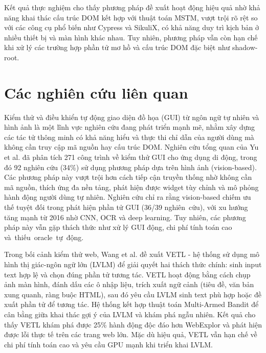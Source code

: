 \documentclass[a4paper, 12pt]{report}
\begin{document}
{\begin{tcolorbox}[
    colback=gray!10,
    colframe=gray!50!black,
    title=Trả lời cho RQ3,
    fonttitle=\bfseries,
    coltitle=white,
    colbacktitle=gray!50!black
]
Kết quả thực nghiệm cho thấy phương pháp đề xuất hoạt động hiệu quả nhờ khả năng khai thác cấu trúc DOM kết hợp với thuật toán MSTM, vượt trội rõ rệt so với các công cụ phổ biến như Cypress và SikuliX, có khả năng duy trì kịch bản ở nhiều thiết bị và màn hình khác nhau. Tuy nhiên, phương pháp vẫn còn hạn chế khi xử lý các trường hợp phần tử mơ hồ và cấu trúc DOM đặc biệt như shadow-root.
\end{tcolorbox}







\chapter{Các nghiên cứu liên quan}


Kiểm thử và điều khiển tự động giao diện đồ họa (GUI) từ ngôn ngữ tự nhiên và hình ảnh là một lĩnh vực nghiên cứu đang phát triển mạnh mẽ, nhằm xây dựng các tác tử thông minh có khả năng hiểu và thực thi chỉ dẫn của người dùng mà không cần truy cập mã nguồn hay cấu trúc DOM. Nghiên cứu tổng quan của Yu et al. \cite{yu2025visionbasedmobileappgui} đã phân tích 271 công trình về kiểm thử GUI cho ứng dụng di động, trong đó 92 nghiên cứu (34\%) sử dụng phương pháp dựa trên hình ảnh (vision-based). Các phương pháp này vượt trội hơn cách tiếp cận truyền thống nhờ không cần mã nguồn, thích ứng đa nền tảng, phát hiện được widget tùy chỉnh và mô phỏng hành động người dùng tự nhiên. Nghiên cứu chỉ ra rằng vision-based chiếm ưu thế tuyệt đối trong phát hiện phần tử GUI (36/39 nghiên~cứu), với xu hướng tăng mạnh từ 2016 nhờ CNN, OCR và deep learning. Tuy nhiên, các phương pháp này vẫn gặp thách thức như xử lý GUI động, chi phí tính toán cao và~thiếu~oracle~tự~động.

Trong bối cảnh kiểm thử web, Wang et al. \cite{wang2024leveraginglargevisionlanguage} đề xuất VETL - hệ thống sử dụng mô hình thị giác-ngôn ngữ lớn (LVLM) để giải quyết hai thách thức chính: sinh input text hợp lệ và chọn đúng phần tử tương tác. VETL hoạt động bằng cách chụp ảnh màn hình, đánh dấu các ô nhập liệu, trích xuất ngữ cảnh (tiêu đề, văn bản xung quanh, ràng buộc HTML), sau đó yêu cầu LVLM sinh text phù hợp hoặc đề xuất phần tử để tương tác. Hệ thống kết hợp thuật toán Multi-Armed Bandit để cân bằng giữa khai thác gợi ý của LVLM và khám phá ngẫu nhiên. Kết quả cho thấy VETL khám phá được 25\% hành động độc đáo hơn WebExplor và phát hiện được lỗi thực tế trên các trang web lớn. Mặc dù hiệu quả, VETL vẫn hạn chế về chi phí tính toán cao và yêu cầu GPU mạnh khi triển khai LVLM.

}
\end{document}
